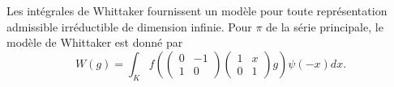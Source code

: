 \documentclass[11pt,a4paper]{amsart}
\theoremstyle{plain}
\theoremstyle{definition}
\theoremstyle{remark}
\begin{document}
\subsubsection{}
\label{sec:3.2.10}

Les int\'egrales de Whittaker fournissent un mod\`ele pour toute repr\'esentation admissible irr\'eductible de dimension infinie. Pour $\pi$ de la s\'erie principale, le mod\`ele de Whittaker est donn\'e par
\[ W(g) = \int_{K} f\left(\begin{pmatrix} 0 & -1 \\ 1 & 0 \end{pmatrix} \begin{pmatrix} 1 & x \\ 0 & 1 \end{pmatrix} g\right) \psi(-x) dx. \]
\end{document}

